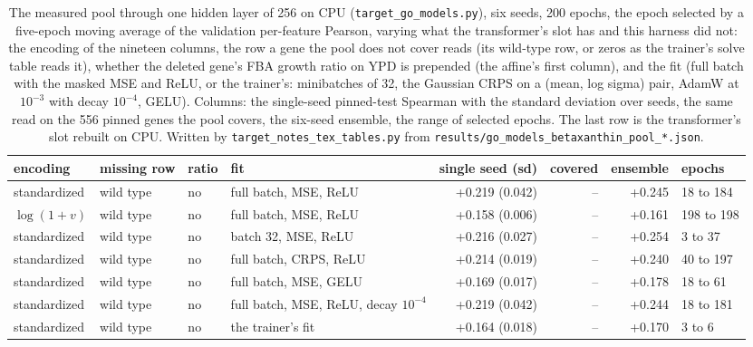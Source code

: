 \begin{table}[H]
  \centering
  \footnotesize
  \caption[The pool perceptron under the trainer's encoding, missing row and fit]{The measured pool through one hidden layer of 256 on CPU (\texttt{target\_go\_models.py}), six seeds, 200 epochs, the epoch selected by a five-epoch moving average of the validation per-feature Pearson, varying what the transformer's slot has and this harness did not: the encoding of the nineteen columns, the row a gene the pool does not cover reads (its wild-type row, or zeros as the trainer's solve table reads it), whether the deleted gene's FBA growth ratio on YPD is prepended (the affine's first column), and the fit (full batch with the masked MSE and ReLU, or the trainer's: minibatches of 32, the Gaussian CRPS on a (mean, log sigma) pair, AdamW at $10^{-3}$ with decay $10^{-4}$, GELU). Columns: the single-seed pinned-test Spearman with the standard deviation over seeds, the same read on the 556 pinned genes the pool covers, the six-seed ensemble, the range of selected epochs. The last row is the transformer's slot rebuilt on CPU. Written by \texttt{target\_notes\_tex\_tables.py} from \texttt{results/go\_models\_betaxanthin\_pool\_*.json}.}
  \label{tab:pool-fit-variants}
  \begin{tabular}{@{}llllrrrl@{}}
    \hline
    encoding & missing row & ratio & fit & single seed (sd) & covered & ensemble & epochs \\
    \hline
    standardized & wild type & no & full batch, MSE, ReLU & +0.219 (0.042) & -- & +0.245 & 18 to 184 \\
    $\log(1+v)$ & wild type & no & full batch, MSE, ReLU & +0.158 (0.006) & -- & +0.161 & 198 to 198 \\
    standardized & wild type & no & batch 32, MSE, ReLU & +0.216 (0.027) & -- & +0.254 & 3 to 37 \\
    standardized & wild type & no & full batch, CRPS, ReLU & +0.214 (0.019) & -- & +0.240 & 40 to 197 \\
    standardized & wild type & no & full batch, MSE, GELU & +0.169 (0.017) & -- & +0.178 & 18 to 61 \\
    standardized & wild type & no & full batch, MSE, ReLU, decay $10^{-4}$ & +0.219 (0.042) & -- & +0.244 & 18 to 181 \\
    standardized & wild type & no & the trainer's fit & +0.164 (0.018) & -- & +0.170 & 3 to 6 \\

\end{tabular}
\end{table}

